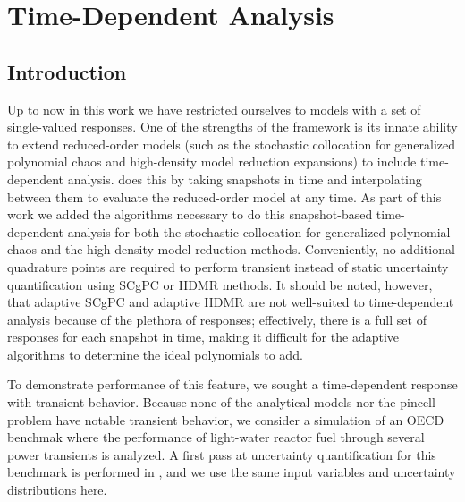 
\chapter{Time-Dependent Analysis} %

\label{ch:timedep} %



\section{Introduction}
Up to now in this work we have restricted ourselves to models with a set of single-valued responses.  One of the strengths
of the \raven{} \cite{OECDraven} framework is its innate ability to extend reduced-order models (such as the stochastic 
collocation for generalized polynomial chaos and high-density model reduction expansions) to
include time-dependent analysis.  \raven{} does this by taking snapshots in time and interpolating between them to evaluate
the reduced-order model at any time.  As part of this work we added the algorithms necessary to do this snapshot-based
time-dependent analysis for both the stochastic collocation for generalized polynomial chaos and the high-density model
reduction methods. Conveniently, no additional quadrature points are required to perform transient instead of static
uncertainty quantification using SCgPC or HDMR methods.  It should be noted, however, that adaptive SCgPC and adaptive
HDMR are not well-suited to time-dependent analysis because of the plethora of responses; effectively, there is a
full set of responses for each snapshot in time, making it difficult for the adaptive algorithms to determine the
ideal polynomials to add.

To demonstrate performance of this feature, we sought a time-dependent response with transient behavior.
Because none of the analytical models nor the \mammoth{} pincell problem have notable transient behavior, we consider
a \bison{} \cite{OECDbison} simulation of an OECD benchmak \cite{OECDbenchmark} where the performance of light-water reactor fuel 
through several power transients is analyzed.  A first pass at uncertainty quantification for this benchmark
is performed in \cite{OECDdakota}, and we use the same input variables and uncertainty distributions here.

